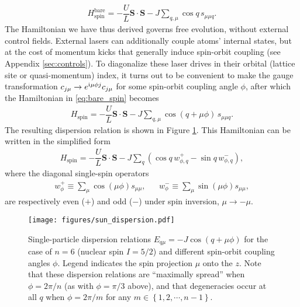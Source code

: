 \documentclass[nofootinbib,notitlepage,11pt]{revtex4-2}
\renewcommand{\t}{\text} %
\newcommand{\f}[2]{\dfrac{#1}{#2}} %
\newcommand{\p}[1]{\left(#1\right)} %
\renewcommand{\set}[1]{\left\{#1\right\}} %
\renewcommand{\v}{\bm} %
\renewcommand{\c}{\cdot} %
\renewcommand{\i}{\mathrm{i}\mkern1mu} %
\newcommand{\1}{\mathds{1}}
\begin{document}
\begin{align}
  H_{\t{spin}}^{\t{bare}}
  = -\f{U}{L} \v S \c\v S - J \sum_{q,\mu} \cos q\, s_{\mu\mu q}.
  \label{eq:bare_spin}
\end{align}
The Hamiltonian we have thus derived governs free evolution, without external control fields.
External lasers can additionally couple atoms' internal states, but at the cost of momentum kicks that generally induce spin-orbit coupling (see Appendix \ref{sec:controls}).
To diagonalize these laser drives in their orbital (lattice site or quasi-momentum) index, it turns out to be convenient to make the gauge transformation $c_{j\mu}\to e^{\i\mu\phi j} c_{j\mu}$ for some spin-orbit coupling angle $\phi$, after which the Hamiltonian in \eqref{eq:bare_spin} becomes
\begin{align}
  H_{\t{spin}} = -\f{U}{L} \v S \c\v S
  - J \sum_{q,\mu} \cos\p{q+\mu\phi}\, s_{\mu\mu q}.
  \label{eq:spin_cos}
\end{align}
The resulting dispersion relation is shown in Figure \ref{fig:dispersion}.
This Hamiltonian can be written in the simplified form
\begin{align}
  H_{\t{spin}} = -\f{U}{L} \v S\c\v S
  - J \sum_q \p{\cos q\, w_{\phi,q}^+ - \sin q\, w_{\phi,q}^-},
  \label{eq:spin_pair}
\end{align}
where the diagonal single-spin operators
\begin{align}
  w_\phi^+ \equiv \sum_\mu \cos\p{\mu\phi} s_{\mu\mu},
  &&
  w_\phi^- \equiv \sum_\mu \sin\p{\mu\phi} s_{\mu\mu},
\end{align}
are respectively even ($+$) and odd ($-$) under spin inversion, $\mu\to-\mu$.

\begin{figure}
  \centering
  \texttt{[image: figures/sun\_dispersion.pdf]}
  \caption{Single-particle dispersion relations $E_{q\mu}=-J\cos\p{q+\mu\phi}$ for the case of $n=6$ (nuclear spin $I=5/2$) and different spin-orbit coupling angles $\phi$.
    Legend indicates the spin projection $\mu$ onto the $z$.
    Note that these dispersion relations are ``maximally spread'' when $\phi=2\pi/n$ (as with $\phi=\pi/3$ above), and that degeneracies occur at all $q$ when $\phi=2\pi/m$ for any $m\in\set{1,2,\cdots,n-1}$.}
  \label{fig:dispersion}
\end{figure}
\end{document}
